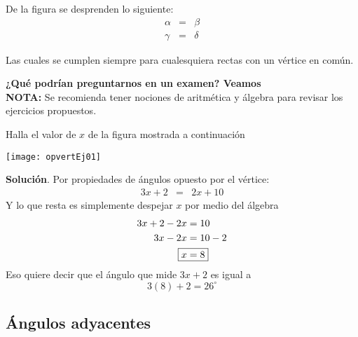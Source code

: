 De la figura  se desprenden lo siguiente:
\begin{equation*}
\boxed{
\begin{array}{rcl}	
		\alpha &=& \beta \\
		\gamma &=& \delta 
	\end{array}
}
\end{equation*}

Las cuales se cumplen siempre para cualesquiera rectas con un vértice en común.

\textbf{¿Qué podrían preguntarnos en un examen? Veamos} \\

\textbf{NOTA:} Se recomienda tener nociones de aritmética y álgebra para revisar
los ejercicios propuestos.


\begin{example}
  Halla el valor de $x$ de la figura mostrada a continuación
  \begin{center}
    \texttt{[image: opvertEj01]}
  \end{center}
  \textbf{Solución}. Por propiedades de ángulos opuesto por el vértice:
  \begin{equation*}
    \begin{array}{rcl}	
        3x + 2 & = & 2x + 10
    \end{array}
  \end{equation*}
  Y lo que resta es simplemente despejar $x$ por medio del álgebra
  \begin{align*}
      3x + 2 - 2x & = 10 \\
      3x - 2x & = 10 - 2 \\
      \Aboxed{x & = 8}
  \end{align*} 
  Eso quiere decir que el ángulo que mide $3x +2$ es igual a 
  \[3(8) + 2 = 26^\circ\]
\end{example}

\subsection{Ángulos adyacentes}


